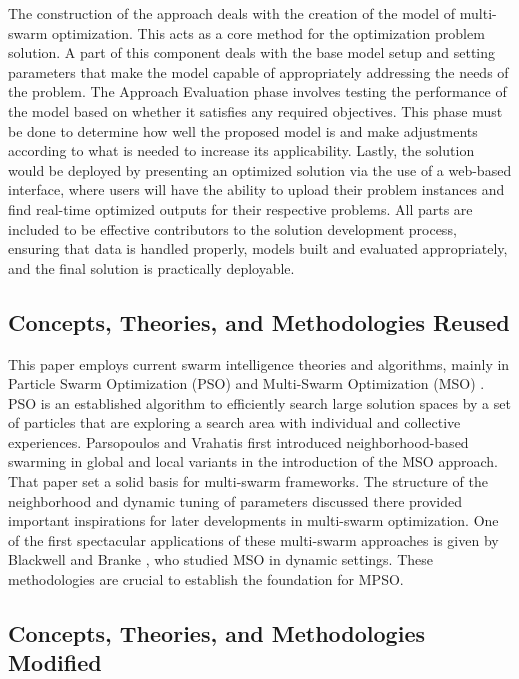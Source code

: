 The construction of the approach deals with the creation of the model of multi-swarm optimization. This acts as a core method for the optimization problem solution. A part of this component deals with the base model setup and setting parameters that make the model capable of appropriately addressing the needs of the problem. The Approach Evaluation phase involves testing the performance of the model based on whether it satisfies any required objectives. This phase must be done to determine how well the proposed model is and make adjustments according to what is needed to increase its applicability. Lastly, the solution would be deployed by presenting an optimized solution via the use of a web-based interface, where users will have the ability to upload their problem instances and find real-time optimized outputs for their respective problems. All parts are included to be effective contributors to the solution development process, ensuring that data is handled properly, models built and evaluated appropriately, and the final solution is practically deployable. 

\subsection{Concepts, Theories, and Methodologies Reused}

This paper employs current swarm intelligence theories and algorithms, mainly in Particle Swarm Optimization (PSO) \cite{kennedy1995particle} and Multi-Swarm Optimization (MSO) \cite{MultiSwarm2004} \cite{Blackwell2006-ms}. PSO is an established algorithm to efficiently search large solution spaces by a set of particles that are exploring a search area with individual and collective experiences. Parsopoulos and Vrahatis \cite{parsopoulos2002recent} first introduced neighborhood-based swarming in global and local variants in the introduction of the MSO approach. That paper set a solid basis for multi-swarm frameworks. The structure of the neighborhood and dynamic tuning of parameters discussed there provided important inspirations for later developments in multi-swarm optimization. One of the first spectacular applications of these multi-swarm approaches is given by Blackwell and Branke \cite{MultiSwarm2004}, who studied MSO in dynamic settings. These methodologies are crucial to establish the foundation for MPSO.

\subsection{Concepts, Theories, and Methodologies Modified}

